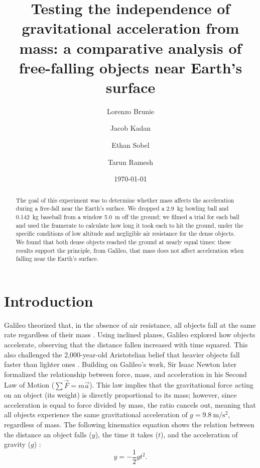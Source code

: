 \documentclass[reprint,amsmath,amssymb,aps,twoside]{revtex4-2}
\begin{document}
\setcounter{page}{50}

\title{Testing the independence of gravitational acceleration from mass: a comparative analysis of free-falling objects near Earth’s surface}
\author{Lorenzo Brunie}
\author{Jacob Kadan}
\author{Ethan Sobel}
\author{Tarun Ramesh}
\date{\today}

\begin{abstract}
The goal of this experiment was to determine whether mass affects the acceleration during a free-fall near the Earth’s surface. We dropped a \qty{2.9}{\kilo\gram} bowling ball and \qty{0.142}{\kilo\gram} baseball from a window \qty{5.0}{\meter} off the ground; we filmed a trial for each ball and used the framerate to calculate how long it took each to hit the ground, under the specific conditions of low altitude and negligible air resistance for the dense objects.  We found that both dense objects reached the ground at nearly equal times: these results support the principle, from Galileo, that mass does not affect acceleration when falling near the Earth's surface.
\end{abstract}


\maketitle\thispagestyle{mytitlepage}




\section{Introduction}
Galileo theorized that, in the absence of air resistance, all objects fall at the same rate regardless of their mass \cite{galilei:1638:discorsi, machamer:2021:galileo}. Using inclined planes, Galileo explored how objects accelerate, observing that the distance fallen increased with time squared. This also challenged the 2,000-year-old Aristotelian belief that heavier objects fall faster than lighter ones \cite{aristotle:physics}. Building on Galileo’s work, Sir Isaac Newton later formalized the relationship between force, mass, and acceleration in his Second Law of Motion ($\sum \vec{F}=m\vec{a}$). This law implies that the gravitational force acting on an object (its weight) is directly proportional to its mass; however, since acceleration is equal to force divided by mass, the ratio cancels out, meaning that all objects experience the same gravitational acceleration of $g=\qty{9.8}{\meter\per\second\squared}$, regardless of mass. The following kinematics equation shows the relation between the distance an object falls ($y$), the time it takes ($t$), and the acceleration of gravity ($g$) \cite{tipler, openstax, barrons}:
\begin{equation}
y = -\frac{1}{2} g t^2.
\end{equation}
\end{document}
